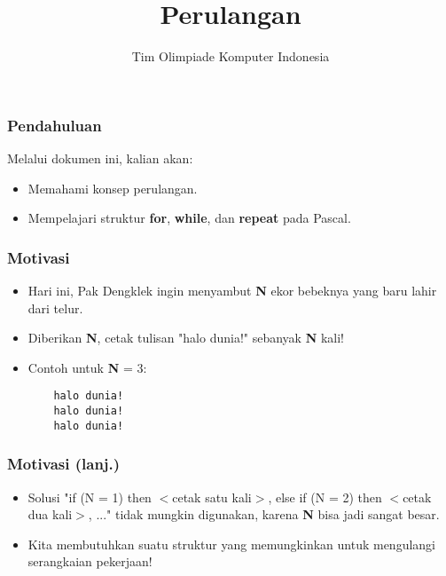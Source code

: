 

\title{Perulangan}
\author{Tim Olimpiade Komputer Indonesia}
\date{}



\begin{frame}
\titlepage
\end{frame}

\begin{frame}
\frametitle{Pendahuluan}
Melalui dokumen ini, kalian akan:
\begin{itemize}
  \item Memahami konsep perulangan.
  \item Mempelajari struktur \textbf{for}, \textbf{while}, dan \textbf{repeat} pada Pascal.
\end{itemize}
\end{frame}

\begin{frame}[fragile]
\frametitle{Motivasi}
\begin{itemize}
  \item Hari ini, Pak Dengklek ingin menyambut \textbf{N} ekor bebeknya yang baru lahir dari telur.
  \item Diberikan \textbf{N}, cetak tulisan "halo dunia!" sebanyak \textbf{N} kali!
  \item Contoh untuk \textbf{N} = 3:
  \begin{lstlisting}
    halo dunia!
    halo dunia!
    halo dunia!
  \end{lstlisting}
\end{itemize}
\end{frame}

\begin{frame}
\frametitle{Motivasi (lanj.)}
\begin{itemize}
  \item Solusi "if (N = 1) then $<$cetak satu kali$>$, else if (N = 2) then $<$cetak dua kali$>$, ..." tidak mungkin digunakan, karena \textbf{N} bisa jadi sangat besar.
  \item Kita membutuhkan suatu struktur yang memungkinkan untuk mengulangi serangkaian pekerjaan!
\end{itemize}
\end{frame}

